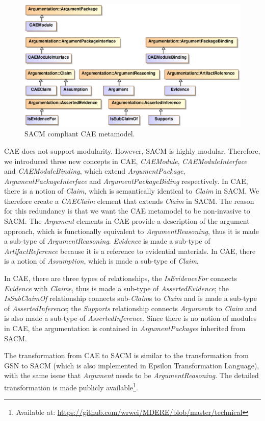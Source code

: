 \begin{figure}
	\centering
	\includegraphics[width=1\linewidth]{CAE.eps}
	\caption{SACM compliant CAE metamodel.}
	\label{fig:caeMetamodel}
\end{figure}

CAE does not support modularity.
However, SACM is highly modular.
Therefore, we introduced three new concepts in CAE, \textit{CAEModule}, \textit{CAEModuleInterface} and \textit{CAEModuleBinding}, which extend \textit{ArgumentPackage}, \textit{ArgumentPackageInterface} and \textit{ArgumentPackageBiding} respectively.
In CAE, there is a notion of \textit{Claim}, which is semantically identical to \textit{Claim} in SACM. 
We therefore create a \textit{CAEClaim} element that extends \textit{Claim} in SACM. 
The reason for this redundancy is that we want the CAE metamodel to be non-invasive to SACM. 
The \textit{Argument} elements in CAE provide a description of the argument approach, which is functionally equivalent to \textit{ArgumentReasoning}, thus it is made a sub-type of \textit{ArgumentReasoning}.
\textit{Evidence} is made a sub-type of \textit{ArtifactReference} because it is a reference to evidential materials. 
In CAE, there is a notion of \textit{Assumption}, which is made a sub-type of \textit{Claim}. 

In CAE, there are three types of relationships, the \textit{IsEvidenceFor} connects \textit{Evidence} with \textit{Claim}s, thus is made a sub-type of \textit{AssertedEvidence}; the \textit{IsSubClaimOf} relationship connects sub-\textit{Claim}s to \textit{Claim} and is made a sub-type of \textit{AssertedInference}; the \textit{Supports} relationship connects \textit{Argument}s to \textit{Claim} and is also made a sub-type of \textit{AssertedInference}. 
Since there is no notion of modules in CAE, the argumentation is contained in \textit{ArgumentPackage}s inherited from SACM.

The transformation from CAE to SACM is similar to the transformation from GSN to SACM (which is also implemented in Epsilon Transformation Language), with the same issue that \textit{Argument} needs to be \textit{ArgumentReasoning}. 
The detailed transformation is made publicly available\footnote{Available at: \url{https://github.com/wrwei/MDERE/blob/master/technical}}.



